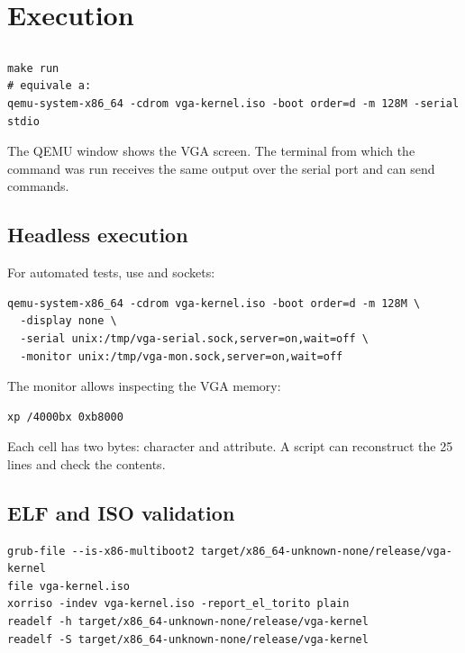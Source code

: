 \section{Execution}

\subsection{}

\begin{lstlisting}[style=shell,caption={Default execution.},label={lst:makerun}]
make run
# equivale a:
qemu-system-x86_64 -cdrom vga-kernel.iso -boot order=d -m 128M -serial stdio
\end{lstlisting}

The QEMU window shows the VGA screen. The terminal from which the command was
run receives the same output over the serial port and can send commands.

\subsection{Headless execution}

For automated tests, use  and sockets:

\begin{lstlisting}[style=shell,caption={Headless QEMU with serial and monitor sockets.},label={lst:qemuheadless}]
qemu-system-x86_64 -cdrom vga-kernel.iso -boot order=d -m 128M \
  -display none \
  -serial unix:/tmp/vga-serial.sock,server=on,wait=off \
  -monitor unix:/tmp/vga-mon.sock,server=on,wait=off
\end{lstlisting}

The monitor allows inspecting the VGA memory:

\begin{lstlisting}[style=shell,caption={Dump of VGA text memory through the monitor.},label={lst:vgadump}]
xp /4000bx 0xb8000
\end{lstlisting}

Each cell has two bytes: character and attribute. A script can reconstruct
the 25 lines and check the contents.

\subsection{ELF and ISO validation}

\begin{lstlisting}[style=shell,caption={Useful checks.},label={lst:validacoes}]
grub-file --is-x86-multiboot2 target/x86_64-unknown-none/release/vga-kernel
file vga-kernel.iso
xorriso -indev vga-kernel.iso -report_el_torito plain
readelf -h target/x86_64-unknown-none/release/vga-kernel
readelf -S target/x86_64-unknown-none/release/vga-kernel
\end{lstlisting}

